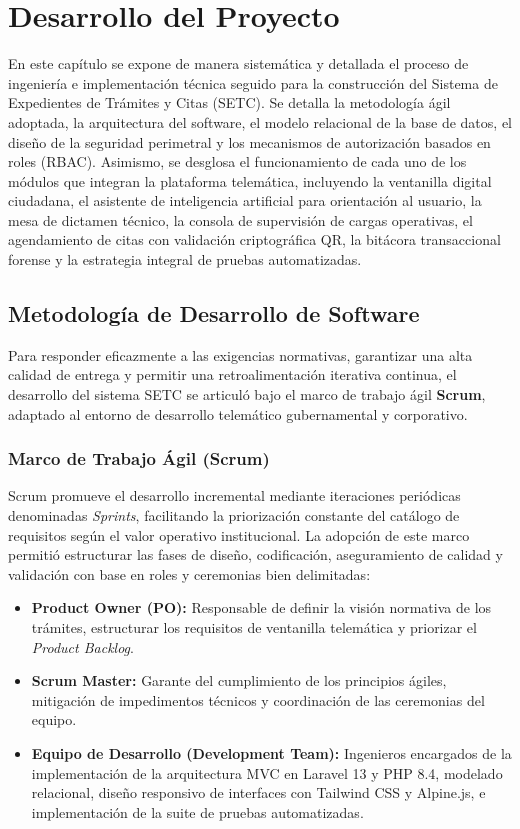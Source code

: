 \chapter{Desarrollo del Proyecto}

En este capítulo se expone de manera sistemática y detallada el proceso de ingeniería e implementación técnica seguido para la construcción del Sistema de Expedientes de Trámites y Citas (SETC). Se detalla la metodología ágil adoptada, la arquitectura del software, el modelo relacional de la base de datos, el diseño de la seguridad perimetral y los mecanismos de autorización basados en roles (RBAC). Asimismo, se desglosa el funcionamiento de cada uno de los módulos que integran la plataforma telemática, incluyendo la ventanilla digital ciudadana, el asistente de inteligencia artificial para orientación al usuario, la mesa de dictamen técnico, la consola de supervisión de cargas operativas, el agendamiento de citas con validación criptográfica QR, la bitácora transaccional forense y la estrategia integral de pruebas automatizadas.

\section{Metodología de Desarrollo de Software}

Para responder eficazmente a las exigencias normativas, garantizar una alta calidad de entrega y permitir una retroalimentación iterativa continua, el desarrollo del sistema SETC se articuló bajo el marco de trabajo ágil \textbf{Scrum}, adaptado al entorno de desarrollo telemático gubernamental y corporativo.

\subsection{Marco de Trabajo Ágil (Scrum)}

Scrum promueve el desarrollo incremental mediante iteraciones periódicas denominadas \textit{Sprints}, facilitando la priorización constante del catálogo de requisitos según el valor operativo institucional. La adopción de este marco permitió estructurar las fases de diseño, codificación, aseguramiento de calidad y validación con base en roles y ceremonias bien delimitadas:

\begin{itemize}
    \item \textbf{Product Owner (PO):} Responsable de definir la visión normativa de los trámites, estructurar los requisitos de ventanilla telemática y priorizar el \textit{Product Backlog}.
    \item \textbf{Scrum Master:} Garante del cumplimiento de los principios ágiles, mitigación de impedimentos técnicos y coordinación de las ceremonias del equipo.
    \item \textbf{Equipo de Desarrollo (Development Team):} Ingenieros encargados de la implementación de la arquitectura MVC en Laravel 13 y PHP 8.4, modelado relacional, diseño responsivo de interfaces con Tailwind CSS y Alpine.js, e implementación de la suite de pruebas automatizadas.
\end{itemize}

